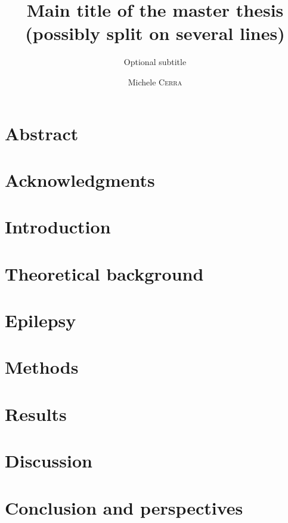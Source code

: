 \documentclass{EPL-master-thesis-covers-EN}
\title{Main title of the master thesis (possibly split on several lines)}
\subtitle{Optional subtitle}
\author{Michele \textsc{Cerra}}
\begin{document}
  \maketitle

  \chapter*{Abstract}
  
  \chapter*{Acknowledgments}

  \tableofcontents

  \chapter*{Introduction}

  \chapter{Theoretical background}
  

  \chapter{Epilepsy}
  
  
  \chapter{Methods}
  

  \chapter{Results}

  \chapter{Discussion}
  

  \chapter*{Conclusion and perspectives}
  
  
  {\footnotesize
  }

  \backcoverpage
\end{document}
